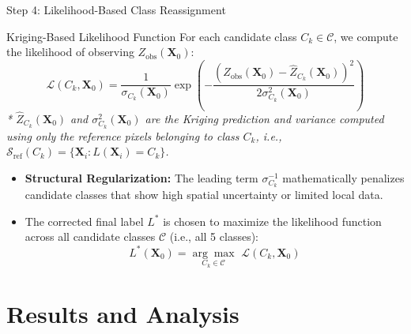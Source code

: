 \documentclass[10pt, aspectratio=169]{beamer}
\begin{document}
\begin{frame}{Step 4: Likelihood-Based Class Reassignment}
    \begin{block}{Kriging-Based Likelihood Function}
        For each candidate class $C_k \in \mathcal{C}$, we compute the likelihood of observing $Z_{\text{obs}}(\mathbf{X}_0)$:
        \begin{equation}
            \mathcal{L}(C_k, \mathbf{X}_0) = \frac{1}{\sigma_{C_k}(\mathbf{X}_0)} \exp \left( - \frac{(Z_{\text{obs}}(\mathbf{X}_0) - \hat{Z}_{C_k}(\mathbf{X}_0))^2}{2\sigma^2_{C_k}(\mathbf{X}_0)} \right)
        \end{equation}
        \textit{* $\hat{Z}_{C_k}(\mathbf{X}_0)$ and $\sigma^2_{C_k}(\mathbf{X}_0)$ are the Kriging prediction and variance computed using only the reference pixels belonging to class $C_k$, i.e., $\mathcal{S}_{\text{ref}}(C_k) = \{ \mathbf{X}_i : L(\mathbf{X}_i) = C_k \}$.}
    \end{block}

    \vspace{0.2cm}
    \begin{itemize}
        \item \textbf{Structural Regularization:} The leading term $\sigma^{-1}_{C_k}$ mathematically penalizes candidate classes that show high spatial uncertainty or limited local data.
        \item The corrected final label $L^*$ is chosen to maximize the likelihood function across all candidate classes $\mathcal{C}$ (i.e., all 5 classes):
              \begin{equation*}
                  L^*(\mathbf{X}_0) = \underset{C_k \in \mathcal{C}}{\arg\max} \,\, \mathcal{L}(C_k, \mathbf{X}_0)
              \end{equation*}
    \end{itemize}

\end{frame}

\section{Results and Analysis}
\end{document}
